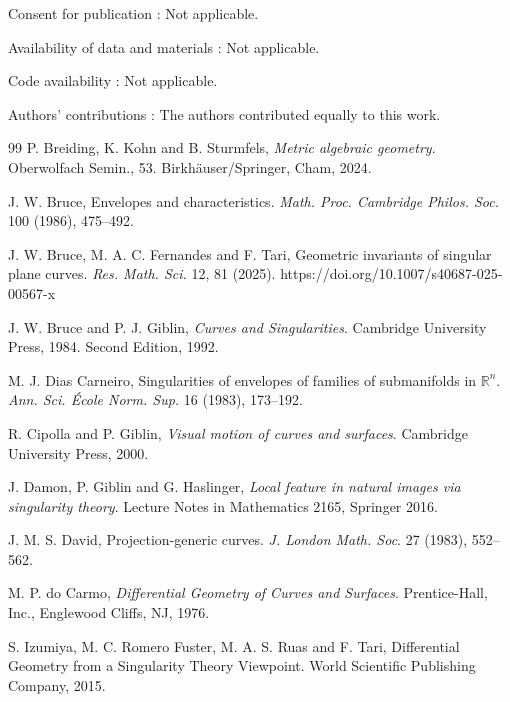 \documentclass[12pt,a4paper]{article}
\begin{document}
\noindent
Consent for publication : Not applicable.

\noindent
Availability of data and materials : Not applicable.

\noindent
Code availability : Not applicable.

\noindent
Authors’ contributions : The authors contributed equally to this work.



\begin{thebibliography}{99}
P. Breiding, K. Kohn and B. Sturmfels, {\it Metric algebraic geometry}.
Oberwolfach Semin., 53. 
Birkhäuser/Springer, Cham, 2024.

J. W. Bruce, Envelopes and characteristics. {\it Math. Proc. Cambridge Philos. Soc.} 100 (1986), 475--492.

J. W. Bruce, M. A. C. Fernandes and F. Tari, Geometric invariants of singular plane curves. 
{\it Res. Math. Sci.} 12, 81 (2025). https://doi.org/10.1007/s40687-025-00567-x

J. W. Bruce and P. J. Giblin, 
{\it Curves and Singularities}. Cambridge University Press, 1984. Second Edition, 1992.

M. J. Dias Carneiro, 
Singularities of envelopes of families of submanifolds in ${\mathbb R}^{n}$.
{\it Ann. Sci. École Norm. Sup.} 16 (1983), 173--192.


R. Cipolla  and P. Giblin, 
{\it Visual motion of curves and surfaces}.  Cambridge University Press,  2000. 

J. Damon, P. Giblin and G. Haslinger, {\it Local feature in natural images via singularity theory}. 
Lecture Notes in Mathematics 2165, Springer 2016.

 J. M. S. David, Projection-generic curves.  {\it J. London Math. Soc}. 27  (1983),  552--562.

 M. P. do Carmo, {\it Differential Geometry of Curves and Surfaces}. 
Prentice-Hall, Inc., Englewood Cliffs, NJ, 1976.



S. Izumiya, M. C. Romero Fuster, M. A. S. Ruas and F. Tari, 
Differential Geometry from a Singularity Theory Viewpoint.
World Scientific Publishing Company, 2015.


\end{thebibliography}
\end{document}
